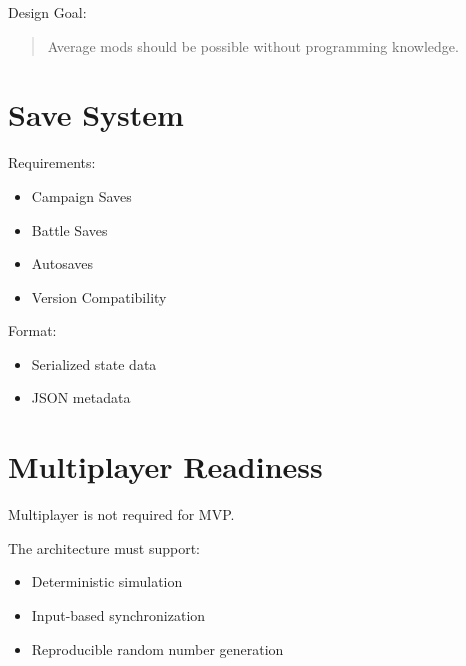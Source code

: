\documentclass[11pt,a4paper]{article}
\begin{document}
Design Goal:

\begin{quote}

Average mods should be possible without programming knowledge.

\end{quote}

\section{Save System}

Requirements:

\begin{itemize}

    \item Campaign Saves

    \item Battle Saves

    \item Autosaves

    \item Version Compatibility

\end{itemize}

Format:

\begin{itemize}

    \item Serialized state data

    \item JSON metadata

\end{itemize}

\section{Multiplayer Readiness}

Multiplayer is not required for MVP.

The architecture must support:

\begin{itemize}

    \item Deterministic simulation

    \item Input-based synchronization

    \item Reproducible random number generation

\end{itemize}
\end{document}
